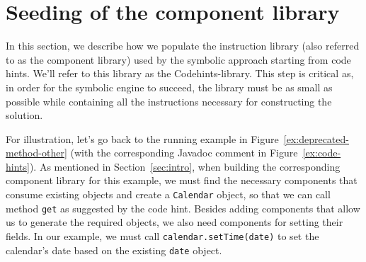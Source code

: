 \documentclass[conference]{IEEEtran}
\begin{document}
  


\section{Seeding of the component library} \label{sec:components-seeding}

In this section, we describe how we populate the instruction library (also referred to as the component library)
used by the symbolic approach starting from code hints. We'll refer to this library as the Codehints-library.
This step is critical as, in order for the symbolic engine to succeed, the library must be as small as possible
while containing all the instructions necessary
for constructing the solution.

For illustration, let's go back to the running example in Figure~\ref{ex:deprecated-method-other} (with the corresponding Javadoc comment in Figure~\ref{ex:code-hints}).
%
As mentioned in Section~\ref{sec:intro}, when building the corresponding component library for this example, 
%
we must find the necessary
components that consume existing objects and create a \lstinline[breaklines=true]{Calendar} object, so that we can call method \lstinline[breaklines=true]{get} as suggested by the code hint.
Besides adding components that allow us to generate the required objects, we also need components for setting their
fields. In our example, we must call
\lstinline[breaklines=true]{calendar.setTime(date)} to set the calendar's date
based on the existing \lstinline[breaklines=true]{date} object.
\end{document}
